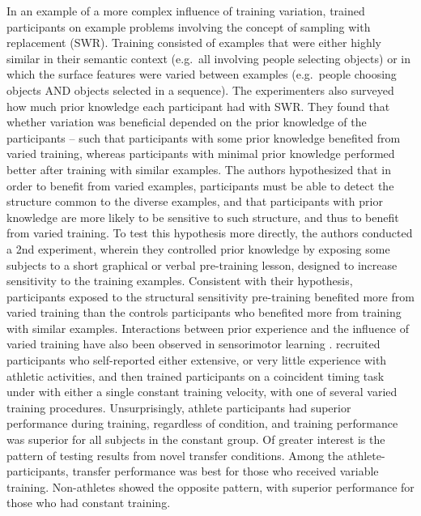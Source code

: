 \documentclass[
  12pt,
  letterpaper,
]{article}
\begin{document}
In an example of a more complex influence of training variation,
\autocite{braithwaiteEffectsVariationPrior2015} trained participants on
example problems involving the concept of sampling with replacement
(SWR). Training consisted of examples that were either highly similar in
their semantic context (e.g.~all involving people selecting objects) or
in which the surface features were varied between examples (e.g.~people
choosing objects AND objects selected in a sequence). The experimenters
also surveyed how much prior knowledge each participant had with SWR.
They found that whether variation was beneficial depended on the prior
knowledge of the participants -- such that participants with some prior
knowledge benefited from varied training, whereas participants with
minimal prior knowledge performed better after training with similar
examples. The authors hypothesized that in order to benefit from varied
examples, participants must be able to detect the structure common to
the diverse examples, and that participants with prior knowledge are
more likely to be sensitive to such structure, and thus to benefit from
varied training. To test this hypothesis more directly, the authors
conducted a 2nd experiment, wherein they controlled prior knowledge by
exposing some subjects to a short graphical or verbal pre-training
lesson, designed to increase sensitivity to the training examples.
Consistent with their hypothesis, participants exposed to the structural
sensitivity pre-training benefited more from varied training than the
controls participants who benefited more from training with similar
examples. Interactions between prior experience and the influence of
varied training have also been observed in sensorimotor learning
\autocite{guadagnoliRelationshipContextualInterference1999,delreyEffectsContextualInterference1982}.
\textcite{delreyEffectsContextualInterference1982} recruited
participants who self-reported either extensive, or very little
experience with athletic activities, and then trained participants on a
coincident timing task under with either a single constant training
velocity, with one of several varied training procedures.
Unsurprisingly, athlete participants had superior performance during
training, regardless of condition, and training performance was superior
for all subjects in the constant group. Of greater interest is the
pattern of testing results from novel transfer conditions. Among the
athlete-participants, transfer performance was best for those who
received variable training. Non-athletes showed the opposite pattern,
with superior performance for those who had constant training.
\end{document}
